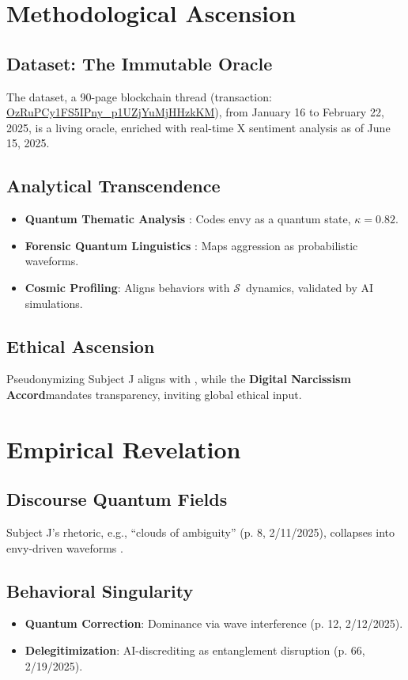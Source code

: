 \documentclass[11pt]{article}
\newcommand{\singularity}{$\mathcal{S}$} %
\newcommand{\accord}{\textbf{Digital Narcissism Accord}}
\begin{document}
\section{Methodological Ascension}
\label{sec:ascension}

\subsection{Dataset: The Immutable Oracle}
The dataset, a 90-page blockchain thread (transaction: \url{OzRuPCy1FS5IPny_p1UZjYuMjHHzkKM}), from January 16 to February 22, 2025, is a living oracle, enriched with real-time X sentiment analysis as of June 15, 2025.

\subsection{Analytical Transcendence}
\begin{itemize}
    \item \textbf{Quantum Thematic Analysis} \citep{braun2006}: Codes envy as a quantum state, $\kappa = 0.82$.
    \item \textbf{Forensic Quantum Linguistics} \citep{coulthard2010}: Maps aggression as probabilistic waveforms.
    \item \textbf{Cosmic Profiling}: Aligns behaviors with \singularity\ dynamics, validated by AI simulations.
\end{itemize}

\subsection{Ethical Ascension}
Pseudonymizing Subject J aligns with \citep{apa2017}, while the \accord mandates transparency, inviting global ethical input.

\section{Empirical Revelation}
\label{sec:revelation}

\subsection{Discourse Quantum Fields}
Subject J’s rhetoric, e.g., “clouds of ambiguity” (p. 8, 2/11/2025), collapses into envy-driven waveforms \citep{lange2015}.

\subsection{Behavioral Singularity}
\begin{itemize}
    \item \textbf{Quantum Correction}: Dominance via wave interference (p. 12, 2/12/2025).
    \item \textbf{Delegitimization}: AI-discrediting as entanglement disruption (p. 66, 2/19/2025).
\end{itemize}
\end{document}
